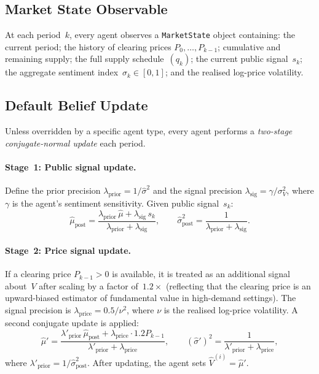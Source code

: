 \documentclass[11pt,a4paper]{article}
\begin{document}
\subsection{Market State Observable}
\label{sec:market-state}

At each period~$k$, every agent observes a \texttt{MarketState} object containing: the current period; the history of clearing prices $P_0,\dots,P_{k-1}$; cumulative and remaining supply; the full supply schedule~$(q_k)$; the current public signal~$s_k$; the aggregate sentiment index~$\sigma_k \in [0,1]$; and the realised log-price volatility.

\subsection{Default Belief Update}
\label{sec:belief-update}

Unless overridden by a specific agent type, every agent performs a \emph{two-stage conjugate-normal update} each period.

\paragraph{Stage~1: Public signal update.}
Define the prior precision $\lambda_{\text{prior}} = 1/\hat{\sigma}^2$ and the signal precision $\lambda_{\text{sig}} = \gamma / \sigma_V^2$, where $\gamma$ is the agent's sentiment sensitivity.  Given public signal~$s_k$:
\begin{equation}\label{eq:belief-stage1}
  \hat{\mu}_{\text{post}} = \frac{\lambda_{\text{prior}}\,\hat{\mu} + \lambda_{\text{sig}}\,s_k}{\lambda_{\text{prior}} + \lambda_{\text{sig}}},
  \qquad
  \hat{\sigma}^2_{\text{post}} = \frac{1}{\lambda_{\text{prior}} + \lambda_{\text{sig}}}.
\end{equation}

\paragraph{Stage~2: Price signal update.}
If a clearing price $P_{k-1} > 0$ is available, it is treated as an additional signal about~$V$ after scaling by a factor of~$1.2\times$ (reflecting that the clearing price is an upward-biased estimator of fundamental value in high-demand settings).  The signal precision is $\lambda_{\text{price}} = 0.5/\nu^2$, where $\nu$ is the realised log-price volatility.  A second conjugate update is applied:
\begin{equation}\label{eq:belief-stage2}
  \hat{\mu}' = \frac{\lambda'_{\text{prior}}\,\hat{\mu}_{\text{post}} + \lambda_{\text{price}} \cdot 1.2 P_{k-1}}{\lambda'_{\text{prior}} + \lambda_{\text{price}}},
  \qquad
  (\hat{\sigma}')^2 = \frac{1}{\lambda'_{\text{prior}} + \lambda_{\text{price}}},
\end{equation}
where $\lambda'_{\text{prior}} = 1/\hat{\sigma}^2_{\text{post}}$.  After updating, the agent sets $\hat{V}^{(i)} = \hat{\mu}'$.
\end{document}
